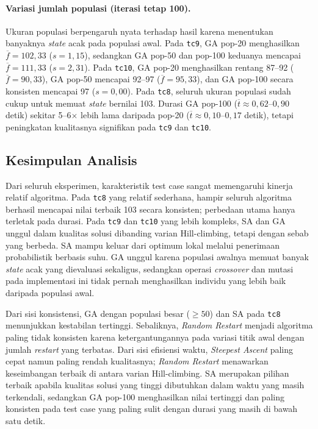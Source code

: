 \paragraph{Variasi jumlah populasi (iterasi tetap 100).}
Ukuran populasi berpengaruh nyata terhadap hasil karena menentukan banyaknya \textit{state} acak pada populasi awal. Pada \texttt{tc9}, GA pop-20 menghasilkan $\overline{f} = 102{,}33$ ($s = 1{,}15$), sedangkan GA pop-50 dan pop-100 keduanya mencapai $\overline{f} = 111{,}33$ ($s = 2{,}31$). Pada \texttt{tc10}, GA pop-20 menghasilkan rentang 87--92 ($\overline{f} = 90{,}33$), GA pop-50 mencapai 92--97 ($\overline{f} = 95{,}33$), dan GA pop-100 secara konsisten mencapai 97 ($s = 0{,}00$). Pada \texttt{tc8}, seluruh ukuran populasi sudah cukup untuk memuat \textit{state} bernilai 103. Durasi GA pop-100 ($\overline{t} \approx 0{,}62$--$0{,}90$ detik) sekitar 5--6$\times$ lebih lama daripada pop-20 ($\overline{t} \approx 0{,}10$--$0{,}17$ detik), tetapi peningkatan kualitasnya signifikan pada \texttt{tc9} dan \texttt{tc10}.

\subsection{Kesimpulan Analisis}

Dari seluruh eksperimen, karakteristik test case sangat memengaruhi kinerja relatif algoritma. Pada \texttt{tc8} yang relatif sederhana, hampir seluruh algoritma berhasil mencapai nilai terbaik 103 secara konsisten; perbedaan utama hanya terletak pada durasi. Pada \texttt{tc9} dan \texttt{tc10} yang lebih kompleks, SA dan GA unggul dalam kualitas solusi dibanding varian Hill-climbing, tetapi dengan sebab yang berbeda. SA mampu keluar dari optimum lokal melalui penerimaan probabilistik berbasis suhu. GA unggul karena populasi awalnya memuat banyak \textit{state} acak yang dievaluasi sekaligus, sedangkan operasi \textit{crossover} dan mutasi pada implementasi ini tidak pernah menghasilkan individu yang lebih baik daripada populasi awal.

Dari sisi konsistensi, GA dengan populasi besar ($\geq 50$) dan SA pada \texttt{tc8} menunjukkan kestabilan tertinggi. Sebaliknya, \textit{Random Restart} menjadi algoritma paling tidak konsisten karena ketergantungannya pada variasi titik awal dengan jumlah \textit{restart} yang terbatas. Dari sisi efisiensi waktu, \textit{Steepest Ascent} paling cepat namun paling rendah kualitasnya; \textit{Random Restart} menawarkan keseimbangan terbaik di antara varian Hill-climbing. SA merupakan pilihan terbaik apabila kualitas solusi yang tinggi dibutuhkan dalam waktu yang masih terkendali, sedangkan GA pop-100 menghasilkan nilai tertinggi dan paling konsisten pada test case yang paling sulit dengan durasi yang masih di bawah satu detik.
